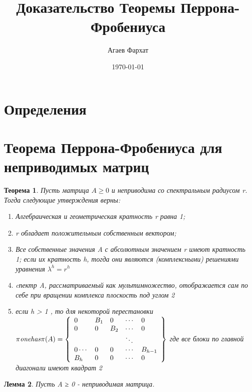 \documentclass{article} %
\author{Агаев Фархат}
\title{Доказательство Теоремы Перрона-Фробениуса}
\date{\today}
\newtheorem{theorem}{Теорема}
\newtheorem{lemma}[theorem]{Лемма}
\begin{document}


\maketitle

\section*{Определения}

\section{Теорема Перрона-Фробениуса для неприводимых матриц}

\begin{theorem}
    Пусть матрица $A \geq 0$ и неприводима со спектральным радиусом r. 
    Тогда следующие утверждения верны:
    \begin{enumerate}
        \it r - это собственное значения для А;
        \item Алгебраическая и геометрическая кратность r равна 1;
        \item r обладает положительным собственным вектором;
        \item Все собственные значения A с абсолютным значением r имеют кратность 1; 
        если их кратность h, тогда они являются
         (комплексными) решениями уравнения $\lambda^h = r^h$
        \item cпектр A, рассматриваемый как мультимножество,
         отображается сам по себе 
        при вращении комплекса плоскость под углом 2
        \item  если h > 1 , то для некоторой перестановки 
        $\pi {\it one has} \pi(A) = \left\{\begin{array}{lllll}
            0 & B_{1} & 0 & \cdots & 0\\
            0 & 0 & B_{2} & \cdots & 0\\
             &  &  & \ddots & \\
            0\cdots & 0 & 0 & \cdots & B_{h-1}\\
            B_{h} & 0 & 0 & \cdots & 0
            \end{array}\right\}$
         где все блоки по главной диагонали имеют квадрат 2
    \end{enumerate}
\end{theorem}
\begin{lemma}
    Пусть A ≥ 0 - неприводимая матрица. 
\end{lemma}
\end{document}

